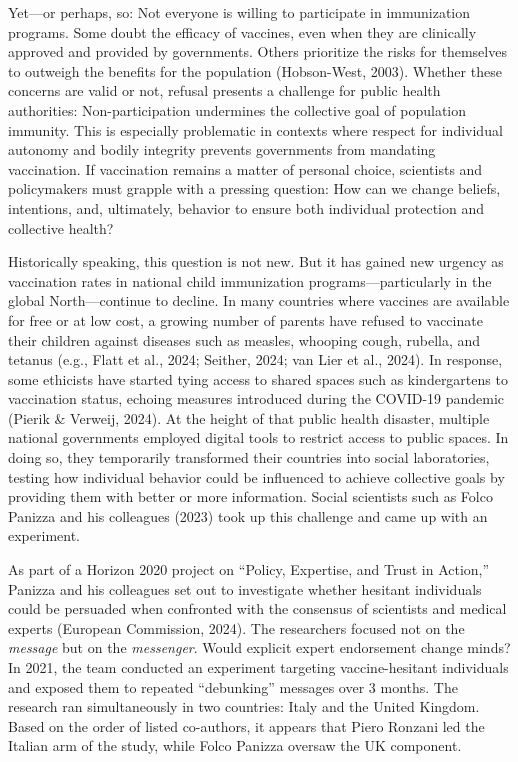 \documentclass[authordate, reflection,issue]{jote-new-article}
\begin{document}
	Yet—or perhaps, so: Not everyone is willing to participate in immunization programs. Some doubt the efficacy of vaccines, even when they are clinically approved and provided by governments. Others prioritize the risks for themselves to outweigh the benefits for the population (Hobson-West, 2003). Whether these concerns are valid or not, refusal presents a challenge for public health authorities: Non-participation undermines the collective goal of population immunity. This is especially problematic in contexts where respect for individual autonomy and bodily integrity prevents governments from mandating vaccination. If vaccination remains a matter of personal choice, scientists and policymakers must grapple with a pressing question: How can we change beliefs, intentions, and, ultimately, behavior to ensure both individual protection and collective health?







	Historically speaking, this question is not new. But it has gained new urgency as vaccination rates in national child immunization programs—particularly in the global North—continue to decline. In many countries where vaccines are available for free or at low cost, a growing number of parents have refused to vaccinate their children against diseases such as measles, whooping cough, rubella, and tetanus (e.g., Flatt et al., 2024; Seither, 2024; van Lier et al., 2024). In response, some ethicists have started tying access to shared spaces such as kindergartens to vaccination status, echoing measures introduced during the COVID-19 pandemic (Pierik \& Verweij, 2024). At the height of that public health disaster, multiple national governments employed digital tools to restrict access to public spaces. In doing so, they temporarily transformed their countries into social laboratories, testing how individual behavior could be influenced to achieve collective goals by providing them with better or more information. Social scientists such as Folco Panizza and his colleagues (2023) took up this challenge and came up with an experiment.







	As part of a Horizon 2020 project on “Policy, Expertise, and Trust in Action,” Panizza and his colleagues set out to investigate whether hesitant individuals could be persuaded when confronted with the consensus of scientists and medical experts (European Commission, 2024). The researchers focused not on the \emph{message} but on the \emph{messenger}. Would explicit expert endorsement change minds? In 2021, the team conducted an experiment targeting vaccine-hesitant individuals and exposed them to repeated “debunking” messages over 3 months. The research ran simultaneously in two countries: Italy and the United Kingdom. Based on the order of listed co-authors, it appears that Piero Ronzani led the Italian arm of the study, while Folco Panizza oversaw the UK component.
\end{document}
